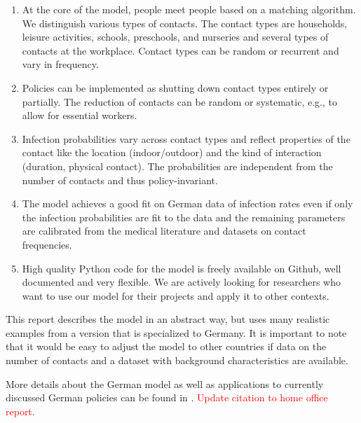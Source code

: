 \begin{enumerate}
    \item At the core of the model, people meet people based on a matching algorithm. We
          distinguish various types of contacts. The contact types are households,
          leisure activities, schools, preschools, and nurseries and several types of
          contacts at the workplace. Contact types can be random or recurrent and vary
          in frequency.

    \item Policies can be implemented as shutting down contact types entirely or
          partially. The reduction of contacts can be random or systematic, e.g., to
          allow for essential workers.

    \item Infection probabilities vary across contact types and reflect properties of
          the contact like the location (indoor/outdoor) and the kind of interaction
          (duration, physical contact). The probabilities are independent from the
          number of contacts and thus policy-invariant.

    \item The model achieves a good fit on German data of infection rates even if only
          the infection probabilities are fit to the data and the remaining parameters
          are calibrated from the medical literature and datasets on contact
          frequencies.

    \item High quality Python code for the model is freely available on Github, well
          documented and very flexible\footnotemark. We are actively looking for
          researchers who want to use our model for their projects and apply it to other
          contexts.
\end{enumerate}


This report describes the model in an abstract way, but uses many realistic examples
from a version that is specialized to Germany. It is important to note that it would
be easy to adjust the model to other countries if data on the number of contacts and
a dataset with background characteristics are available.

More details about the German model as well as applications to currently discussed
German policies can be found in \citet{Dorn2020a}.
\textcolor{red}{Update citation to home office report.}

